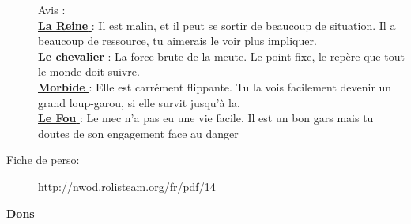 \documentclass[oneside,12pt]{book}
\newcommand{\Dame}{\textbf{La Reine} }
\newcommand{\Chevalier}{\textbf{Le chevalier} }
\newcommand{\Elsa}{\textbf{Morbide} }
\newcommand{\Fou}{\textbf{Le Fou} }
\begin{document}
\begin{flushleft}
\begin{description}
{Avis :\\
\underline{\Dame} : Il est malin, et il peut se sortir de beaucoup de situation. Il a beaucoup de ressource, tu aimerais le voir plus impliquer.\\
\underline{\Chevalier} : La force brute de la meute. Le point fixe, le repère que tout le monde doit suivre.\\
\underline{\Elsa} : Elle est carrément flippante. Tu la vois facilement devenir un grand loup-garou, si elle survit jusqu'à la. \\
\underline{\Fou}: Le mec n'a pas eu une vie facile. Il est un bon gars mais tu doutes de son engagement face au danger \\
}
\item[Fiche de perso:]{\href{http://nwod.rolisteam.org/fr/pdf/14}{http://nwod.rolisteam.org/fr/pdf/14}}
\end{description}

\clearpage
\textbf{\large Dons} 
\vspace{0.5cm}



\clearpage

\end{flushleft}
\end{document}
